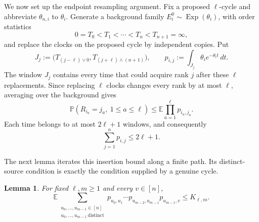\documentclass[11pt]{article}
\newtheorem{lemma}[theorem]{Lemma}
\theoremstyle{remark}
\theoremstyle{plain}
\newcommand{\E}{\mathbb E}
\newcommand{\Pp}{\mathbb P}
\begin{document}
We now set up the endpoint resampling argument.  Fix a proposed $\ell$-cycle
and abbreviate $\theta_{n,i}$ to $\theta_i$.  Generate a background family
$E_i^0\sim\operatorname{Exp}(\theta_i)$, with order statistics
\[
 0=T_0<T_1<\cdots<T_n<T_{n+1}=\infty,
\]
and replace the clocks on the proposed cycle by independent copies.  Put
\begin{equation}\label{eq:ghost-window}
 J_j:=\bigl(T_{(j-\ell)\vee0},T_{(j+\ell)\wedge(n+1)}\bigr),
 \qquad
 p_{i,j}:=\int_{J_j}\theta_i e^{-\theta_i t}\,dt.
\end{equation}
The window $J_j$ contains every time that could acquire rank $j$ after these
$\ell$ replacements.  Since replacing $\ell$ clocks changes every rank by at
most $\ell$, averaging over the background gives
\begin{equation}\label{eq:ghost-cylinder-bound}
 \Pp(R_{i_a}=j_a,\ 1\le a\le\ell)
 \le\E\prod_{a=1}^\ell p_{i_a,j_a}.
\end{equation}
Each time belongs to at most $2\ell+1$ windows, and consequently
\begin{equation}\label{eq:ghost-row-bound}
 \sum_{j=1}^np_{i,j}\le2\ell+1.
\end{equation}

The next lemma iterates this insertion bound along a finite path.  Its
distinct-source condition is exactly the condition supplied by a genuine
cycle.

\begin{lemma}\label{lem:finite-insertion-path}
For fixed $\ell,m\ge1$ and every $v\in[n]$,
\begin{equation}\label{eq:finite-insertion-path}
 \E\sum_{\substack{u_0,\ldots,u_{m-1}\in[n]\\
                    u_0,\ldots,u_{m-1}\ {\mathrm{distinct}}}}
 p_{u_0,u_1}\cdots p_{u_{m-2},u_{m-1}}p_{u_{m-1},v}
 \le K_{\ell,m}.
\end{equation}
\end{lemma}
\end{document}
